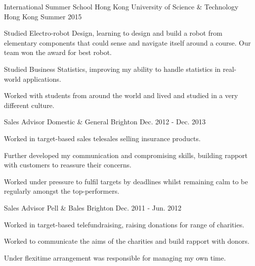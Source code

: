 \begin{cventries}
  \cventry
    {International Summer School}
    {Hong Kong University of Science \& Technology}
    {Hong Kong}
    {Summer 2015}
    {
      \begin{cvitems}
        \item {Studied Electro-robot Design, learning to design and build a robot from elementary components that could sense and navigate itself around a course. Our team won the award for best robot.}
        \item {Studied Business Statistics, improving my ability to handle statistics in real-world applications.}
        \item {Worked with students from around the world and lived and studied in a very different culture.}
      \end{cvitems}
    }
  \cventry
    {Sales Advisor}
    {Domestic \& General}
    {Brighton}
    {Dec. 2012 - Dec. 2013}
    {
      \begin{cvitems}
        \item {Worked in target-based sales telesales selling insurance products.}
        \item{Further developed my communication and compromising skills, building rapport with customers to reassure their concerns.}
        \item {Worked under pressure to fulfil targets by deadlines whilst remaining calm to be regularly amongst the top-performers.}
      \end{cvitems}
    }
  \cventry
    {Sales Advisor}
    {Pell \& Bales}
    {Brighton}
    {Dec. 2011 - Jun. 2012}
    {
      \begin{cvitems}
        \item {Worked in target-based  telefundraising, raising donations for range of charities.}
        \item{Worked to communicate the aims of the charities and build rapport with donors.}
        \item {Under flexitime arrangement was responsible for managing my own time.}
      \end{cvitems}
    }
\end{cventries}
